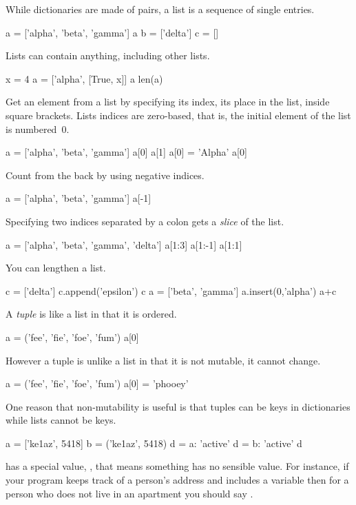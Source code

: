 While dictionaries are made of pairs, a \python{} list is a sequence of single entries.
\begin{pythonconsole}
a = ['alpha', 'beta', 'gamma']
a
b = ['delta']
c = []
\end{pythonconsole}
Lists can contain anything, including other lists.
\begin{pythonconsole}
x = 4
a = ['alpha', [True, x]]
a
len(a)
\end{pythonconsole}
Get an element from a list by specifying its index, its place in the list,
inside square brackets.
Lists indices are zero-based, that is, the initial element of the
list is numbered~$0$.
\begin{pythonconsole}
a = ['alpha', 'beta', 'gamma']
a[0]
a[1]
a[0] = 'Alpha'
a[0]
\end{pythonconsole}
Count from the back by using negative indices.
\begin{pythonconsole}
a = ['alpha', 'beta', 'gamma']
a[-1]
\end{pythonconsole}
Specifying two indices separated by a colon gets a \textit{slice} 
of the list. 
\begin{pythonconsole} 
a = ['alpha', 'beta', 'gamma', 'delta']
a[1:3]
a[1:-1]
a[1:1]
\end{pythonconsole}
You can lengthen a list.
\begin{pythonconsole}
c = ['delta']
c.append('epsilon')
c
a = ['beta', 'gamma']
a.insert(0,'alpha')
a+c
\end{pythonconsole}

A \textit{tuple} is like a list in that it is ordered.
\begin{pythonconsole}
a = ('fee', 'fie', 'foe', 'fum')
a[0]
\end{pythonconsole}
However a tuple is unlike a list 
in that it is not mutable, it cannot change.
\begin{pythonconsole}
a = ('fee', 'fie', 'foe', 'fum')
a[0] = 'phooey'
\end{pythonconsole}
One reason that non-mutability is useful is that 
tuples can be keys in dictionaries while lists cannot be keys.
\begin{pythonconsole}
a = ['ke1az', 5418]
b = ('ke1az', 5418)
d = {a: 'active'}
d = {b: 'active'}
d
\end{pythonconsole}

\python{} has a special value, , that
means something has no sensible value.
For instance, if your program keeps track of a person's address and
includes a variable  then   
for a person who does not live in an
apartment you should say .



